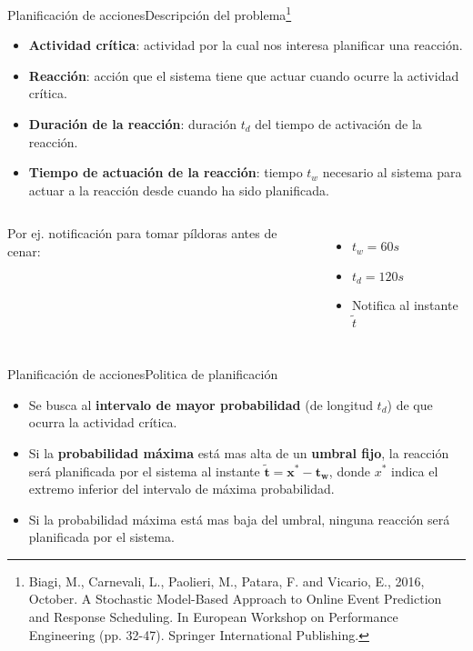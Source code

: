 \documentclass[9pt, handout]{beamer}
\begin{document}
      \begin{frame}{Planificación de acciones}{Descripción del problema\footnote{Biagi, M., Carnevali, L., Paolieri, M., Patara, F. and Vicario, E., 2016, October. A Stochastic Model-Based Approach to Online Event Prediction and Response Scheduling. In European Workshop on Performance Engineering (pp. 32-47). Springer International Publishing.}}
        \pause
        \begin{itemize}
          \item \textbf{Actividad crítica}: actividad por la cual nos interesa planificar una reacción.
          \pause
          \item \textbf{Reacción}: acción que el sistema tiene que actuar cuando ocurre la actividad crítica.
          \pause
          \item \textbf{Duración de la reacción}: duración $t_d$ del tiempo de activación de la reacción.
          \pause
          \item \textbf{Tiempo de actuación de la reacción}: tiempo $t_w$ necesario al sistema para actuar a la reacción desde cuando ha sido planificada.
        \end{itemize}
        
        \pause
       	\begin{columns}
       		\centering
       		
       		Por ej. notificación para tomar píldoras antes de cenar:
       		\begin{itemize}
       			\item $t_w = 60s$
       			\item $t_d = 120s$
       			\item Notifica al instante $\tilde t$
       		\end{itemize}
       	\end{columns}
      \end{frame}
      
      \begin{frame}{Planificación de acciones}{Politica de planificación}
        \pause
        \begin{itemize}
          \item Se busca al \textbf{intervalo de mayor probabilidad} (de longitud $t_d$) de que ocurra la actividad crítica.
          \pause
          \item Si la \textbf{probabilidad máxima} está mas alta de un \textbf{umbral fijo}, la reacción será planificada por el sistema al instante $\boldsymbol{\tilde t = x^* - t_w}$, donde $x^*$ indica el extremo inferior del intervalo de máxima probabilidad.
          \pause
          \item Si la probabilidad máxima está mas baja del umbral, ninguna reacción será planificada por el sistema.
        \end{itemize}
        
        \pause
        \vspace{-1em}
        \centering
        
      \end{frame}
      
\end{document}
